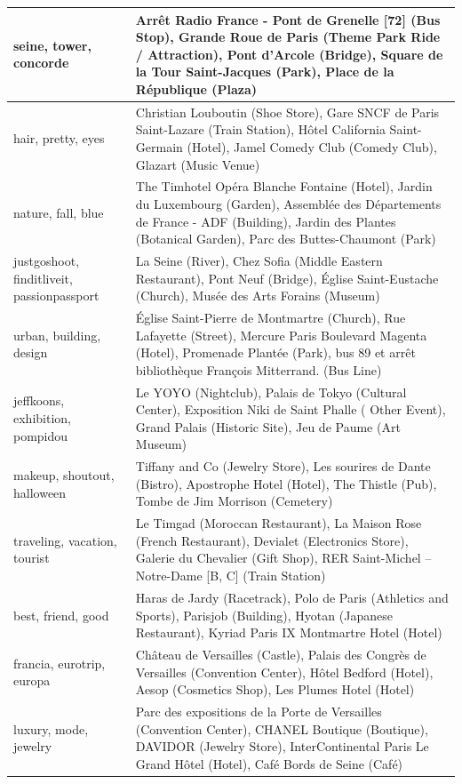 \begin{longtable}{|p{2in}|p{3in}|}
  seine, tower, concorde & Arrêt Radio France - Pont de Grenelle [72] (Bus Stop), Grande Roue de Paris (Theme Park Ride /   Attraction), Pont d'Arcole (Bridge), Square de la Tour Saint-Jacques (Park), Place de la République (Plaza) \\ \hline 
  hair, pretty, eyes & Christian Louboutin (Shoe Store), Gare SNCF de Paris Saint-Lazare (Train Station), Hôtel California  Saint-Germain (Hotel), Jamel Comedy Club (Comedy Club), Glazart (Music Venue) \\ \hline 
  nature, fall, blue & The Timhotel Opéra Blanche Fontaine (Hotel), Jardin du Luxembourg (Garden), Assemblée des Départements   de France - ADF (Building), Jardin des Plantes (Botanical Garden), Parc des Buttes-Chaumont (Park) \\ \hline 
  justgoshoot, finditliveit, passionpassport & La Seine (River), Chez Sofia (Middle Eastern Restaurant), Pont Neuf (Bridge),  Église Saint-Eustache (Church), Musée des Arts Forains (Museum) \\ \hline 
  urban, building, design & Église Saint-Pierre de Montmartre (Church), Rue Lafayette (Street), Mercure Paris Boulevard   Magenta (Hotel), Promenade Plantée (Park), bus 89 et arrêt bibliothèque François Mitterrand. (Bus Line) \\ \hline 
  jeffkoons, exhibition, pompidou & Le YOYO (Nightclub), Palais de Tokyo (Cultural Center), Exposition Niki de Saint Phalle ( Other Event), Grand Palais (Historic Site), Jeu de Paume (Art Museum) \\ \hline 
  makeup, shoutout, halloween & Tiffany and Co (Jewelry Store), Les sourires de Dante (Bistro), Apostrophe Hotel (Hotel), The   Thistle (Pub), Tombe de Jim Morrison (Cemetery) \\ \hline 
  traveling, vacation, tourist & Le Timgad (Moroccan Restaurant), La Maison Rose (French Restaurant), Devialet (Electronics   Store), Galerie du Chevalier (Gift Shop), RER Saint-Michel – Notre-Dame [B, C] (Train Station) \\ \hline 
  best, friend, good & Haras de Jardy (Racetrack), Polo de Paris (Athletics and Sports), Parisjob (Building), Hyotan (Japanese  Restaurant), Kyriad Paris IX Montmartre Hotel (Hotel) \\ \hline 
  francia, eurotrip, europa & Château de Versailles (Castle), Palais des Congrès de Versailles (Convention Center), Hôtel   Bedford (Hotel), Aesop (Cosmetics Shop), Les Plumes Hotel (Hotel) \\ \hline 
  luxury, mode, jewelry & Parc des expositions de la Porte de Versailles (Convention Center), CHANEL Boutique (Boutique),   DAVIDOR (Jewelry Store), InterContinental Paris Le Grand Hôtel (Hotel), Café Bords de Seine (Café) \\ \hline 

\end{longtable}
